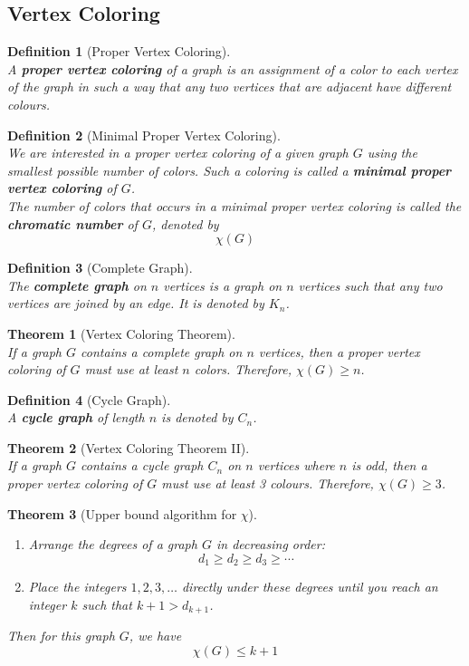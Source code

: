 \documentclass[12pt]{article}
\newtheorem{definition}{Definition}[section]
\newtheorem{theorem}{Theorem}[section]
\theoremstyle{definition}
\begin{document}
\subsection{Vertex Coloring}
\begin{definition}[Proper Vertex Coloring]
\hfill\\\normalfont A \textbf{proper vertex coloring} of a graph is an assignment of a color to each vertex of the graph in such a way that any two vertices that are adjacent have \textit{different} colours.
\end{definition}
\begin{definition}[Minimal Proper Vertex Coloring]\hfill\\\normalfont
We are interested in a proper vertex coloring of a given graph $G$ using the smallest possible number of colors. Such a coloring is called a \textbf{minimal proper vertex coloring} of $G$.\\
The number of colors that occurs in a minimal proper vertex coloring is called the \textbf{chromatic number} of $G$, denoted by
\[
\chi(G)
\]
\end{definition}
\begin{definition}[Complete Graph]
\hfill\\\normalfont The \textbf{complete graph} on $n$ vertices is a graph on $n$ vertices such that any two vertices are joined by an edge. It is denoted by $K_n$.
\end{definition}
\begin{theorem}[Vertex Coloring Theorem]
\hfill\\\normalfont If a graph $G$ contains a complete graph on $n$ vertices, then a proper vertex coloring of $G$ must use at least $n$ colors. Therefore, $\chi(G)\geq n$.
\end{theorem}
\begin{definition}[Cycle Graph]
\hfill\\\normalfont A \textbf{cycle graph} of length $n$ is denoted by $C_n$.
\end{definition}
\begin{theorem}[Vertex Coloring Theorem II]
\hfill\\\normalfont If a graph $G$ contains a cycle graph $C_n$ on $n$ vertices where $n$ is odd, then a proper vertex coloring of $G$ must use at least 3 colours. Therefore, $\chi(G)\geq 3$.
\end{theorem}
\begin{theorem}[Upper bound algorithm for $\chi$]
\hfill\\\normalfont 
\begin{enumerate}
  \item Arrange the degrees of a graph $G$ in decreasing order:
  \[
  d_1\geq d_2\geq d_3\geq \cdots
  \]
  \item Place the integers $1,2,3,\ldots$ directly under these degrees until you reach an integer $k$ such that $k+1>d_{k+1}$.
\end{enumerate}
Then for this graph $G$, we have
\[
\chi(G)\leq k+1
\]
\end{theorem}
\clearpage
\end{document}
